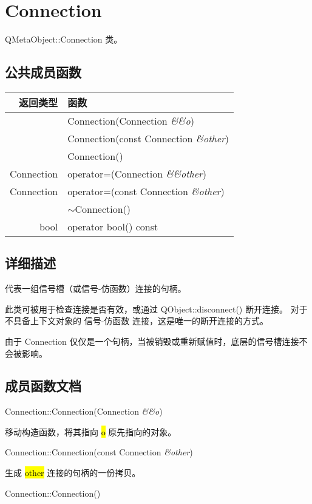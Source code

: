\chapter{Connection}

QMetaObject::Connection 类。

\section{公共成员函数}

\begin{tabular}{|r|l|}
	\hline
返回类型  &	函数 \\ 
\hline
	&Connection(Connection \emph{\&\&o}) \\ 
    \hline
	&Connection(const Connection \emph{\&other}) \\ 
    \hline
	&Connection() \\ 
    \hline
Connection & 	operator=(Connection \emph{\&\&other}) \\ 
\hline
Connection & 	operator=(const Connection \emph{\&other}) \\
	& $\sim$Connection() \\ 
    \hline
bool &	operator bool() const    \\ 
	\hline
\end{tabular}


\section{详细描述}

代表一组信号槽（或信号-仿函数）连接的句柄。

此类可被用于检查连接是否有效，或通过 QObject::disconnect() 断开连接。
对于不具备上下文对象的 信号-仿函数 连接，这是唯一的断开连接的方式。

由于 Connection 仅仅是一个句柄，当被销毁或重新赋值时，底层的信号槽连接不会被影响。

\section{成员函数文档}

Connection::Connection(Connection \emph{\&\&o})

移动构造函数，将其指向 \hl{o} 原先指向的对象。

Connection::Connection(const Connection \emph{\&other})

生成 \hl{other} 连接的句柄的一份拷贝。

Connection::Connection()

